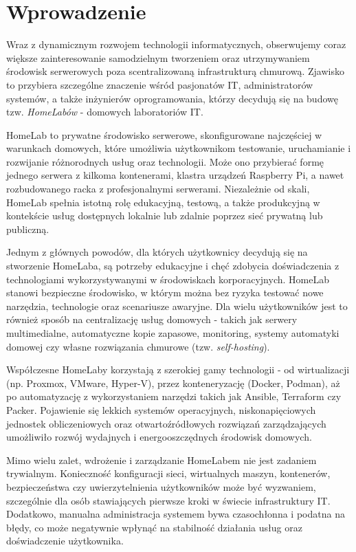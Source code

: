 \chapter{Wprowadzenie}

Wraz z dynamicznym rozwojem technologii informatycznych, obserwujemy coraz większe zainteresowanie samodzielnym tworzeniem oraz utrzymywaniem środowisk serwerowych poza scentralizowaną infrastrukturą chmurową. Zjawisko to przybiera szczególne znaczenie wśród pasjonatów IT, administratorów systemów, a także inżynierów oprogramowania, którzy decydują się na budowę tzw. \textit{HomeLabów} - domowych laboratoriów IT. 

HomeLab to prywatne środowisko serwerowe, skonfigurowane najczęściej w warunkach domowych, które umożliwia użytkownikom testowanie, uruchamianie i rozwijanie różnorodnych usług oraz technologii. Może ono przybierać formę jednego serwera z kilkoma kontenerami, klastra urządzeń Raspberry Pi, a nawet rozbudowanego racka z profesjonalnymi serwerami. Niezależnie od skali, HomeLab spełnia istotną rolę edukacyjną, testową, a także produkcyjną w kontekście usług dostępnych lokalnie lub zdalnie poprzez sieć prywatną lub publiczną.

Jednym z głównych powodów, dla których użytkownicy decydują się na stworzenie HomeLaba, są potrzeby edukacyjne i chęć zdobycia doświadczenia z technologiami wykorzystywanymi w środowiskach korporacyjnych. HomeLab stanowi bezpieczne środowisko, w którym można bez ryzyka testować nowe narzędzia, technologie oraz scenariusze awaryjne. Dla wielu użytkowników jest to również sposób na centralizację usług domowych - takich jak serwery multimedialne, automatyczne kopie zapasowe, monitoring, systemy automatyki domowej czy własne rozwiązania chmurowe (tzw. \textit{self-hosting}).

Współczesne HomeLaby korzystają z szerokiej gamy technologii - od wirtualizacji (np. Proxmox, VMware, Hyper-V), przez konteneryzację (Docker, Podman), aż po automatyzację z wykorzystaniem narzędzi takich jak Ansible, Terraform czy Packer. Pojawienie się lekkich systemów operacyjnych, niskonapięciowych jednostek obliczeniowych oraz otwartoźródłowych rozwiązań zarządzających umożliwiło rozwój wydajnych i energooszczędnych środowisk domowych.

Mimo wielu zalet, wdrożenie i zarządzanie HomeLabem nie jest zadaniem trywialnym. Konieczność konfiguracji sieci, wirtualnych maszyn, kontenerów, bezpieczeństwa czy uwierzytelnienia użytkowników może być wyzwaniem, szczególnie dla osób stawiających pierwsze kroki w świecie infrastruktury IT. Dodatkowo, manualna administracja systemem bywa czasochłonna i podatna na błędy, co może negatywnie wpłynąć na stabilność działania usług oraz doświadczenie użytkownika.

